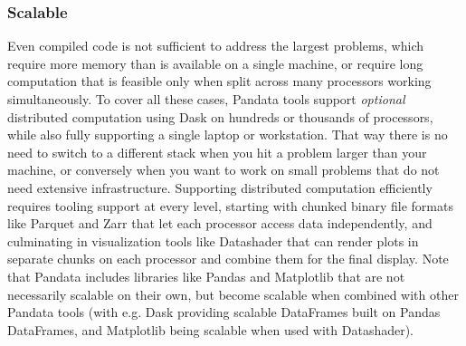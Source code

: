 \subsubsection{Scalable}
Even compiled code is not sufficient to address the largest problems, which require more memory than is available on a single machine, or require long computation that is feasible only when split across many processors working simultaneously. To cover all these cases, Pandata tools support \emph{optional} distributed computation using Dask \cite{dask} on hundreds or thousands of processors, while also fully supporting a single laptop or workstation. That way there is no need to switch to a different stack when you hit a problem larger than your machine, or conversely when you want to work on small problems that do not need extensive infrastructure. Supporting distributed computation efficiently requires tooling support at every level, starting with chunked binary file formats like Parquet and Zarr that let each processor access data independently, and culminating in visualization tools like Datashader that can render plots in separate chunks on each processor and combine them for the final display. Note that Pandata includes libraries like Pandas and Matplotlib that are not necessarily scalable on their own, but become scalable when combined with other Pandata tools (with e.g. Dask providing scalable DataFrames built on Pandas DataFrames, and Matplotlib being scalable when used with Datashader).

